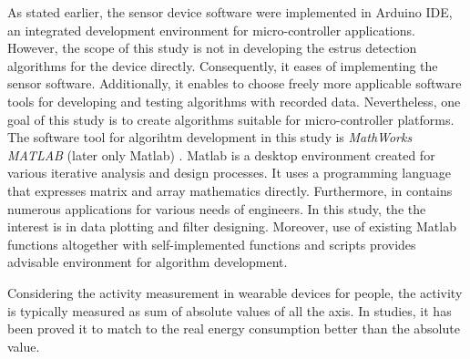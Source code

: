 \documentclass[english,12pt,a4paper,pdftex,elec,utf8]{aaltothesis}
\begin{document}
As stated earlier, the sensor device software were implemented in Arduino IDE, an integrated development environment for micro-controller applications. However, the scope of this study is not in developing the estrus detection algorithms for the device directly. Consequently, it eases of implementing the sensor software. Additionally, it enables to choose freely more applicable software tools for developing and testing algorithms with recorded data. Nevertheless, one goal of this study is to create algorithms suitable for micro-controller platforms. The software tool for algorihtm development in this study is \textit{MathWorks MATLAB} (later only Matlab) \cite{matlaboverview}. Matlab is a desktop environment created for various iterative analysis and design processes. It uses a programming language that expresses matrix and array mathematics directly. Furthermore, in contains numerous applications for various needs of engineers. In this study, the the interest is in data plotting and filter designing. Moreover, use of existing Matlab functions altogether with self-implemented functions and scripts provides advisable environment for algorithm development.  



Considering the activity measurement in wearable devices for people, the activity is typically measured as sum of absolute values of all the axis. In studies, it has been proved it to match to the real energy consumption better than the absolute value. 
\end{document}
